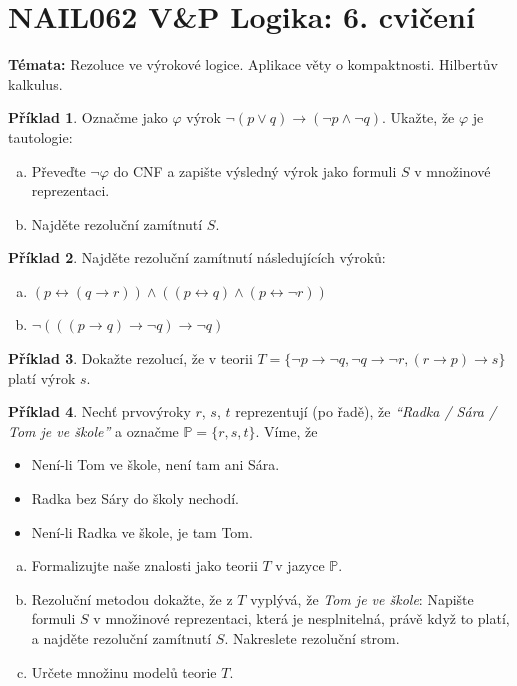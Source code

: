 \documentclass[a4paper]{article}
\theoremstyle{plain}
\theoremstyle{definition}
\newtheorem{problem}{Příklad}
\begin{document}
\section*{NAIL062 V\&P Logika: 6. cvičení}


\textbf{Témata:} 
Rezoluce ve výrokové logice. Aplikace věty o kompaktnosti. Hilbertův kalkulus.


\medskip\begin{problem}
Označme jako $\varphi$ výrok $\neg (p \vee q) \to (\neg p \wedge \neg q)$. Ukažte, že $\varphi$ je tautologie:
\begin{enumerate}[(a)]
    \item Převeďte $\neg \varphi$ do CNF a zapište výsledný výrok jako formuli $S$ v množinové reprezentaci.
    \item Najděte rezoluční zamítnutí $S$.
\end{enumerate}
\end{problem}


\medskip\begin{problem}
Najděte rezoluční zamítnutí následujících výroků:
\begin{enumerate}[(a)]
    \item $(p\leftrightarrow (q\to r))\wedge((p\leftrightarrow q)\wedge(p\leftrightarrow \neg r))$
    \item $\neg(((p\to q)\to \neg q)\to \neg q)$
\end{enumerate}
\end{problem}
    
    
\medskip\begin{problem}
Dokažte rezolucí, že v teorii $T=\{\neg p \to \neg q,\neg q \to \neg r, (r\to p)\to s\}$ platí výrok $s$.
\end{problem}


\medskip\begin{problem}Nechť prvovýroky $r$, $s$, $t$  reprezentují (po řadě), že \emph{``Radka / Sára / Tom je ve škole''} a označme $\mathbb{P}=\{r,s,t\}$. Víme, že
    \begin{itemize}
    \item Není-li Tom ve škole, není tam ani Sára.
    \item Radka bez Sáry do školy nechodí.
    \item Není-li Radka ve škole, je tam Tom.
    \end{itemize}
    \begin{enumerate}[(a)]
    \item Formalizujte naše znalosti jako teorii $T$ v jazyce $\mathbb P$.
    \item Rezoluční metodou dokažte, že z $T$ vyplývá, že \emph{Tom je ve škole}: Napište formuli $S$ v množinové reprezentaci, která je nesplnitelná, právě když to platí, a najděte rezoluční zamítnutí $S$. Nakreslete rezoluční strom.
    \item Určete množinu modelů teorie $T$.
    \end{enumerate}
\end{problem}
\end{document}
